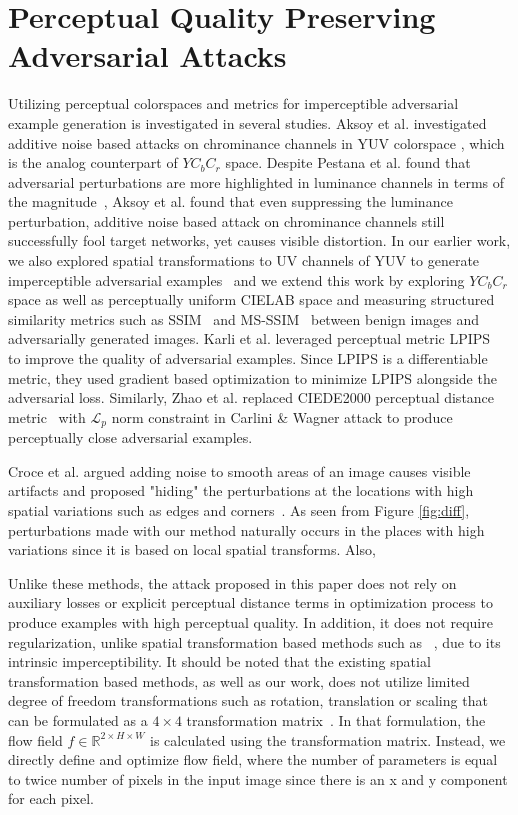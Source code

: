 \section{Perceptual Quality Preserving Adversarial Attacks}

Utilizing perceptual colorspaces and metrics for imperceptible adversarial example generation is investigated in several studies. Aksoy et al. investigated additive noise based attacks on chrominance channels in YUV colorspace \cite{aksoy2019attack}, which is the analog counterpart of \(YC_{b}C_{r}\) space. Despite Pestana et al. found that adversarial perturbations are more highlighted in luminance channels in terms of the magnitude~\cite{Pestana2020-hm}, Aksoy et al. found that even suppressing the luminance perturbation, additive noise based attack on chrominance channels still successfully fool target networks, yet causes visible distortion. In our earlier work, we also explored spatial transformations to UV channels of YUV to generate imperceptible adversarial examples~\cite{aydin2019imperceptible} and we extend this work by exploring \(YC_{b}C_{r}\) space as well as perceptually uniform CIELAB space and measuring structured similarity metrics such as SSIM~\cite{wang2004image} and MS-SSIM~\cite{wang2003multiscale} between benign images and adversarially generated images. Karli et al. leveraged perceptual metric LPIPS~\cite{zhang2018unreasonable} to improve the quality of adversarial examples. Since LPIPS is a differentiable metric, they used gradient based optimization to minimize LPIPS alongside the adversarial loss. Similarly, Zhao et al. replaced CIEDE2000 perceptual distance metric~\cite{luo2001development} with \(\mathcal{L}_{p}\) norm constraint in Carlini \& Wagner attack to produce perceptually close adversarial examples.

Croce et al. argued adding noise to smooth areas of an image causes visible artifacts and proposed "hiding" the perturbations at the locations with high spatial variations such as edges and corners~\cite{croce2019sparse}. As seen from Figure \ref{fig:diff}, perturbations made with our method naturally occurs in the places with high variations since it is based on local spatial transforms. Also,

Unlike these methods, the attack proposed in this paper does not rely on auxiliary losses or explicit perceptual distance terms in optimization process to produce examples with high perceptual quality. In addition, it does not require regularization, unlike spatial transformation based methods such as ~\cite{xiao2018spatially}, due to its intrinsic imperceptibility. It should be noted that the existing spatial transformation based methods, as well as our work, does not utilize limited degree of freedom transformations such as rotation, translation or scaling that can be formulated as a \(4\times4\) transformation matrix~\cite{jaderberg2015spatial}. In that formulation, the flow field \(f \in \mathbb{R}^{2\times H \times W}\) is calculated using the transformation matrix. Instead, we directly define and optimize flow field, where the number of parameters is equal to twice number of pixels in the input image since there is an x and y component for each pixel.

